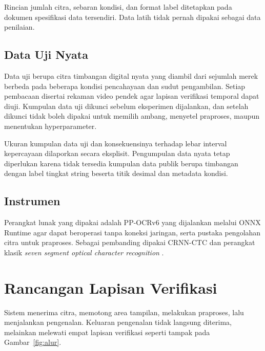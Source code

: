 Rincian jumlah citra, sebaran kondisi, dan format label ditetapkan pada dokumen
spesifikasi data tersendiri. Data latih tidak pernah dipakai sebagai data
penilaian.

\subsection{Data Uji Nyata}

Data uji berupa citra timbangan digital nyata yang diambil dari sejumlah merek
berbeda pada beberapa kondisi pencahayaan dan sudut pengambilan. Setiap
pembacaan disertai rekaman video pendek agar lapisan verifikasi temporal dapat
diuji. Kumpulan data uji dikunci sebelum eksperimen dijalankan, dan setelah
dikunci tidak boleh dipakai untuk memilih ambang, menyetel praproses, maupun
menentukan hyperparameter.

Ukuran kumpulan data uji dan konsekuensinya terhadap lebar interval kepercayaan
dilaporkan secara eksplisit. Pengumpulan data nyata tetap diperlukan karena
tidak tersedia kumpulan data publik berupa timbangan dengan label tingkat string
beserta titik desimal dan metadata kondisi.

\subsection{Instrumen}

Perangkat lunak yang dipakai adalah PP-OCRv6 \parencite{zhang2026ppocrv6} yang
dijalankan melalui ONNX Runtime agar dapat beroperasi tanpa koneksi jaringan,
serta pustaka pengolahan citra untuk praproses. Sebagai pembanding dipakai
CRNN-CTC \parencite{shi2017crnn} dan perangkat klasik \textit{seven segment
optical character recognition} \parencite{auerswal_ssocr}.

\section{Rancangan Lapisan Verifikasi}

Sistem menerima citra, memotong area tampilan, melakukan praproses, lalu
menjalankan pengenalan. Keluaran pengenalan tidak langsung diterima, melainkan
melewati empat lapisan verifikasi seperti tampak pada Gambar~\ref{fig:alur}.

